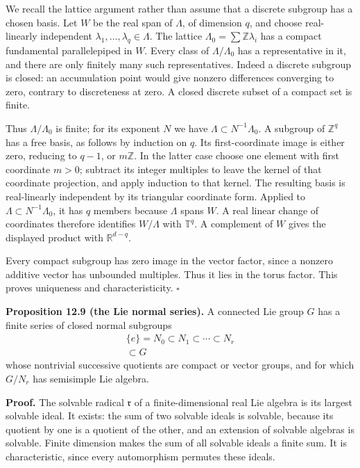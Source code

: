 \documentclass[
  11pt,
]{article}
\begin{document}
We recall the lattice argument rather than assume that a discrete
subgroup has a chosen basis. Let \(W\) be the real span of \(\Lambda\),
of dimension \(q\), and choose real-linearly independent
\(\lambda_1,\ldots,\lambda_q\in\Lambda\). The lattice
\(\Lambda_0=\sum\mathbb Z\lambda_i\) has a compact fundamental
parallelepiped in \(W\). Every class of \(\Lambda/\Lambda_0\) has a
representative in it, and there are only finitely many such
representatives. Indeed a discrete subgroup is closed: an accumulation
point would give nonzero differences converging to zero, contrary to
discreteness at zero. A closed discrete subset of a compact set is
finite.

Thus \(\Lambda/\Lambda_0\) is finite; for its exponent \(N\) we have
\(\Lambda\subset N^{-1}\Lambda_0\). A subgroup of \(\mathbb Z^q\) has a
free basis, as follows by induction on \(q\). Its first-coordinate image
is either zero, reducing to \(q-1\), or \(m\mathbb Z\). In the latter
case choose one element with first coordinate \(m>0\); subtract its
integer multiples to leave the kernel of that coordinate projection, and
apply induction to that kernel. The resulting basis is real-linearly
independent by its triangular coordinate form. Applied to
\(\Lambda\subset N^{-1}\Lambda_0\), it has \(q\) members because
\(\Lambda\) spans \(W\). A real linear change of coordinates therefore
identifies \(W/\Lambda\) with \(\mathbb T^q\). A complement of \(W\)
gives the displayed product with \(\mathbb R^{d-q}\).

Every compact subgroup has zero image in the vector factor, since a
nonzero additive vector has unbounded multiples. Thus it lies in the
torus factor. This proves uniqueness and characteristicity. \(\square\)

\textbf{Proposition 12.9 (the Lie normal series).} A connected Lie group
\(G\) has a finite series of closed normal subgroups \[
\begin{gathered}
\{e\}=N_0\subset N_1\subset\cdots\subset N_r\\
\subset G
\end{gathered}
\tag{12.32}
\] whose nontrivial successive quotients are compact or vector groups,
and for which \(G/N_r\) has semisimple Lie algebra.

\textbf{Proof.} The solvable radical \(\mathfrak r\) of a
finite-dimensional real Lie algebra is its largest solvable ideal. It
exists: the sum of two solvable ideals is solvable, because its quotient
by one is a quotient of the other, and an extension of solvable algebras
is solvable. Finite dimension makes the sum of all solvable ideals a
finite sum. It is characteristic, since every automorphism permutes
these ideals.
\end{document}
